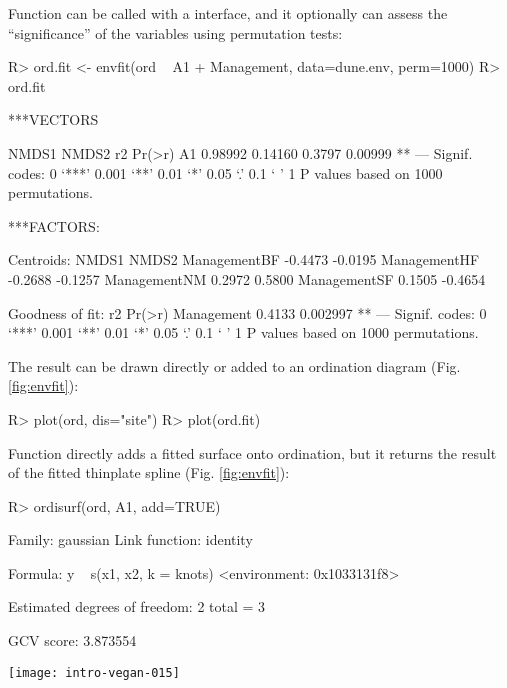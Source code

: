 \documentclass[article,nojss]{jss}
\begin{document}
Function  can be called with a 
interface, and it optionally can assess the ``significance'' of the
variables using permutation tests:
\begin{Schunk}
\begin{Sinput}
R> ord.fit <- envfit(ord ~ A1 + Management, data=dune.env, perm=1000)
R> ord.fit
\end{Sinput}
\begin{Soutput}
***VECTORS

     NMDS1   NMDS2     r2  Pr(>r)   
A1 0.98992 0.14160 0.3797 0.00999 **
---
Signif. codes:  0 ‘***’ 0.001 ‘**’ 0.01 ‘*’ 0.05 ‘.’ 0.1 ‘ ’ 1 
P values based on 1000 permutations.

***FACTORS:

Centroids:
               NMDS1   NMDS2
ManagementBF -0.4473 -0.0195
ManagementHF -0.2688 -0.1257
ManagementNM  0.2972  0.5800
ManagementSF  0.1505 -0.4654

Goodness of fit:
               r2   Pr(>r)   
Management 0.4133 0.002997 **
---
Signif. codes:  0 ‘***’ 0.001 ‘**’ 0.01 ‘*’ 0.05 ‘.’ 0.1 ‘ ’ 1 
P values based on 1000 permutations.
\end{Soutput}
\end{Schunk}
The result can be drawn directly or added to an ordination diagram
(Fig. \ref{fig:envfit}):
\begin{Schunk}
\begin{Sinput}
R> plot(ord, dis="site")
R> plot(ord.fit)
\end{Sinput}
\end{Schunk}

Function  directly adds a fitted surface onto
ordination, but it returns the result of the fitted thinplate spline
 (Fig. \ref{fig:envfit}):
\begin{Schunk}
\begin{Sinput}
R> ordisurf(ord, A1, add=TRUE)
\end{Sinput}
\begin{Soutput}
Family: gaussian 
Link function: identity 

Formula:
y ~ s(x1, x2, k = knots)
<environment: 0x1033131f8>

Estimated degrees of freedom:
2  total = 3 

GCV score: 3.873554
\end{Soutput}
\end{Schunk}
\begin{SCfigure}
\texttt{[image: intro-vegan-015]}
\caption{Fitted vector and smooth surface for the thickness of A1
  horizon (, in cm), and centroids of Management levels.}
\label{fig:envfit}
\end{SCfigure}
\end{document}
